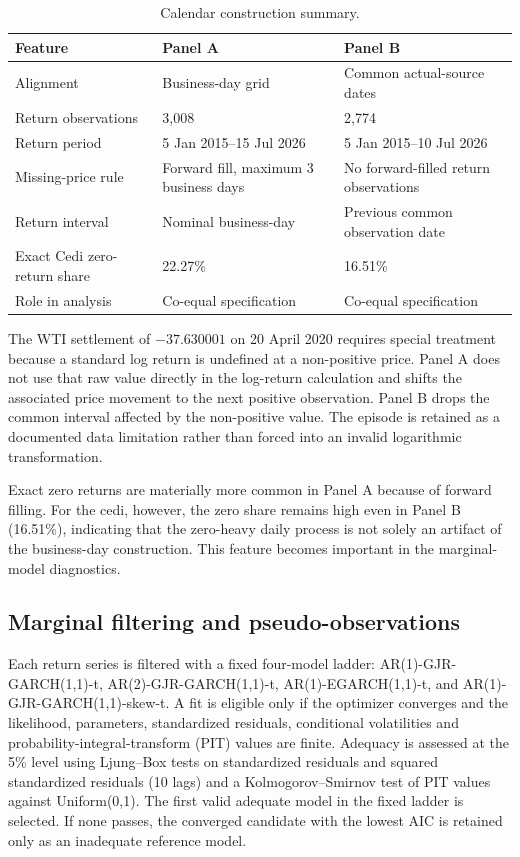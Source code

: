 \begin{table}[htbp]
\centering
\caption{Calendar construction summary.}
\label{tab:calendar-summary}
\small
\begin{tabularx}{\textwidth}{lXX}
\toprule
\textbf{Feature} & \textbf{Panel A} & \textbf{Panel B} \\
\midrule
Alignment & Business-day grid & Common actual-source dates \\
Return observations & 3,008 & 2,774 \\
Return period & 5 Jan 2015--15 Jul 2026 & 5 Jan 2015--10 Jul 2026 \\
Missing-price rule & Forward fill, maximum 3 business days & No forward-filled return observations \\
Return interval & Nominal business-day & Previous common observation date \\
Exact Cedi zero-return share & 22.27\% & 16.51\% \\
Role in analysis & Co-equal specification & Co-equal specification \\
\bottomrule
\end{tabularx}
\end{table}

The WTI settlement of \(-37.630001\) on 20 April 2020 requires special treatment because a standard log return is undefined at a non-positive price. Panel A does not use that raw value directly in the log-return calculation and shifts the associated price movement to the next positive observation. Panel B drops the common interval affected by the non-positive value. The episode is retained as a documented data limitation rather than forced into an invalid logarithmic transformation.

Exact zero returns are materially more common in Panel A because of forward filling. For the cedi, however, the zero share remains high even in Panel B (16.51\%), indicating that the zero-heavy daily process is not solely an artifact of the business-day construction. This feature becomes important in the marginal-model diagnostics.

\subsection{Marginal filtering and pseudo-observations}

Each return series is filtered with a fixed four-model ladder: AR(1)-GJR-GARCH(1,1)-t, AR(2)-GJR-GARCH(1,1)-t, AR(1)-EGARCH(1,1)-t, and AR(1)-GJR-GARCH(1,1)-skew-t. A fit is eligible only if the optimizer converges and the likelihood, parameters, standardized residuals, conditional volatilities and probability-integral-transform (PIT) values are finite. Adequacy is assessed at the 5\% level using Ljung--Box tests on standardized residuals and squared standardized residuals (10 lags) and a Kolmogorov--Smirnov test of PIT values against Uniform(0,1). The first valid adequate model in the fixed ladder is selected. If none passes, the converged candidate with the lowest AIC is retained only as an inadequate reference model.


